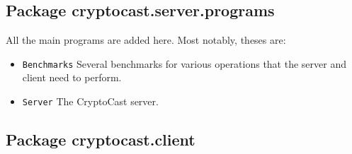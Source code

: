\documentclass[a4paper,10pt]{scrartcl}
\begin{document}
\subsection{Package cryptocast.server.programs}
All the main programs are added here. Most notably, theses are:
\begin{itemize}
 \item \lstinline|Benchmarks| Several benchmarks for various operations that the
   server and client need to perform.
 \item \lstinline|Server|  The CryptoCast server.
\end{itemize}

\subsection{Package cryptocast.client}
\end{document}
